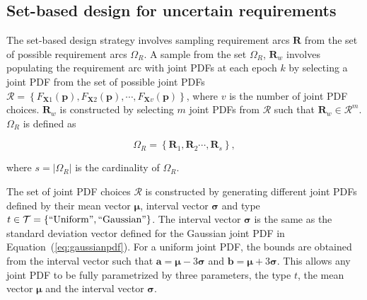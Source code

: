 \subsection{Set-based design for uncertain requirements} \label{subsec:SBDproblem}


The set-based design strategy involves sampling requirement arcs $\mathbf{R}$ from the set of possible requirement arcs $\Omega_R$. A sample from the set $\Omega_R$, $\mathbf{R}_w$ involves populating the requirement arc with joint \acp{PDF} at each epoch $k$ by selecting a joint \ac{PDF} from the set of possible joint \acp{PDF} $\mathcal{R} = \left\{F_{\mathbf{X}1}(\mathbf{p}),F_{\mathbf{X}2}(\mathbf{p}),\cdots,F_{\mathbf{X}v}(\mathbf{p})\right\}$, where $v$ is the number of joint \ac{PDF} choices. $\mathbf{R}_w$ is constructed by selecting $m$ joint \acp{PDF} from $\mathcal{R}$ such that $\mathbf{R}_w \in \mathcal{R}^m$. $\Omega_R$ is defined as

\begin{equation} \label{eq:Rarcsample}
	\Omega_R = \left\{\mathbf{R}_1,\mathbf{R}_2\cdots,\mathbf{R}_s\right\},
\end{equation}

where $s = |\Omega_R|$ is the cardinality of $\Omega_R$.

The set of joint \ac{PDF} choices $\mathcal{R}$ is constructed by generating different joint \acp{PDF} defined by their mean vector $\boldsymbol{\mu}$, interval vector $\boldsymbol{\sigma}$ and type $t\in\mathcal{T} = \left\{\mathrm{``Uniform"},\mathrm{``Gaussian"}\right\}$. The interval vector $\boldsymbol{\sigma}$ is the same as the standard deviation vector defined for the Gaussian joint \ac{PDF} in Equation~(\ref{eq:gaussianpdf}). For a uniform joint \ac{PDF}, the bounds are obtained from the interval vector such that $\mathbf{a} = \boldsymbol{\mu} - 3\boldsymbol{\sigma}$ and $\mathbf{b} = \boldsymbol{\mu} + 3\boldsymbol{\sigma}$. This allows any joint \ac{PDF} to be fully parametrized by three parameters, the type $t$, the mean vector $\boldsymbol{\mu}$ and the interval vector $\boldsymbol{\sigma}$.

